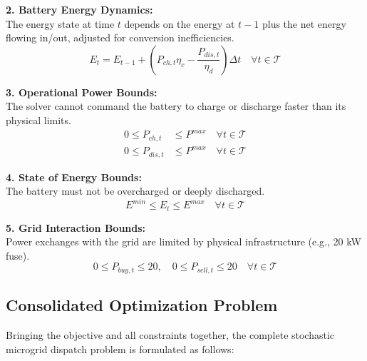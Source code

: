 \documentclass[12pt, a4paper]{article}
\begin{document}
\noindent \textbf{2. Battery Energy Dynamics:} \\
The energy state at time $t$ depends on the energy at $t-1$ plus the net energy flowing in/out, adjusted for conversion inefficiencies.
\begin{equation}
    E_t = E_{t-1} + \left( P_{ch,t} \eta_{c} - \frac{P_{dis,t}}{\eta_{d}} \right) \Delta t \quad \forall t \in \mathcal{T}
\end{equation}

\noindent \textbf{3. Operational Power Bounds:} \\
The solver cannot command the battery to charge or discharge faster than its physical limits.
\begin{align}
    0 \le P_{ch,t} &\le P^{max} \quad \forall t \in \mathcal{T} \\
    0 \le P_{dis,t} &\le P^{max} \quad \forall t \in \mathcal{T}
\end{align}

\noindent \textbf{4. State of Energy Bounds:} \\
The battery must not be overcharged or deeply discharged.
\begin{equation}
    E^{min} \le E_t \le E^{max} \quad \forall t \in \mathcal{T}
\end{equation}

\noindent \textbf{5. Grid Interaction Bounds:} \\
Power exchanges with the grid are limited by physical infrastructure (e.g., 20 kW fuse).
\begin{equation}
    0 \le P_{buy,t} \le 20, \quad 0 \le P_{sell,t} \le 20 \quad \forall t \in \mathcal{T}
\end{equation}

\subsection{Consolidated Optimization Problem}
Bringing the objective and all constraints together, the complete stochastic microgrid dispatch problem is formulated as follows:
\end{document}
